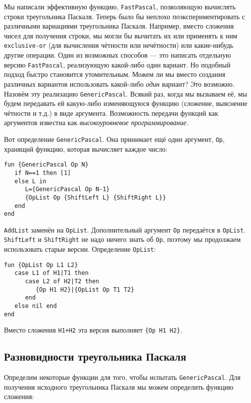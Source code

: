 Мы написали эффективную функцию, \lstinline|FastPascal|, позволяющую вычислять строки треугольника Паскаля. Теперь было бы неплохо поэкспериментировать с различными вариациями треугольника Паскаля. Например, вместо сложения чисел для получения строки, мы могли бы вычитать их или применять к ним \lstinline|exclusive-or| (для вычисления чётности или нечётности) или какие-нибудь другие операции. Один из возможных способов --- это написать отдельную версию \lstinline|FastPascal|, реализующую какой-либо один вариант. Но подобный подход быстро становится утомительным. Можем ли мы вместо создания различных вариантов использовать какой-либо \emph{один} вариант? Это возможно. Назовём эту реализацию \lstinline|GenericPascal|. Всякий раз, когда мы вызываем её, мы будем передавать ей какую-либо изменяющуюся функцию (сложение, выяснение чётности и т.д.) в виде аргумента. Возможность передачи функций как аргументов известна как \emph{высокоуровневое программирование}.

Вот определение \lstinline|GenericPascal|. Она принимает ещё один аргумент, \lstinline|Op|, хранящий функцию, которая вычисляет каждое число:



\begin{lstlisting}
fun {GenericPascal Op N}
   if N==1 then [1]
   else L in
      L={GenericPascal Op N-1}
      {OpList Op {ShiftLeft L} {ShiftRight L}}
   end
end
\end{lstlisting}


\lstinline|AddList| заменён на \lstinline|OpList|. Дополнительный аргумент \lstinline|Op| передаётся в \lstinline|OpList|. \lstinline|ShiftLeft| и \lstinline|ShiftRight| не надо ничего знать об \lstinline|Op|, поэтому мы продолжаем использовать старые версии. Определение \lstinline|OpList|:

\begin{lstlisting}
fun {OpList Op L1 L2}
   case L1 of H1|T1 then
      case L2 of H2|T2 then
         {Op H1 H2}|{OpList Op T1 T2}
      end
   else nil end
end
\end{lstlisting}


Вместо сложения \lstinline|H1+H2| эта версия выполняет \lstinline|{Op H1 H2}|.

\subsection{Разновидности треугольника Паскаля}

Определим некоторые функции для того, чтобы испытать \lstinline|GenericPascal|. Для получения исходного треугольника Паскаля мы можем определить функцию сложения:


